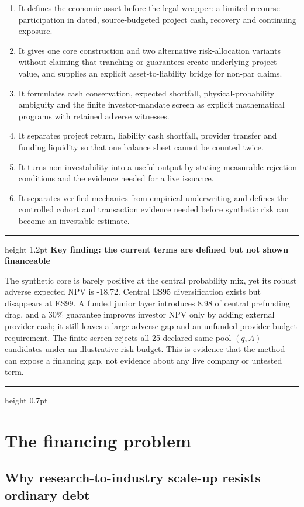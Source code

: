 \documentclass[11pt,a4paper]{article}
\newenvironment{paperbox}[1]{%
  \begin{center}\begin{minipage}{0.96\textwidth}%
  \color{Forest}\hrule height 1.2pt\vspace{0.65em}%
  {\large\bfseries #1}\par\smallskip\color{black}%
}{%
  \vspace{0.45em}\color{Gold}\hrule height 0.7pt
  \end{minipage}\end{center}%
}
\begin{document}
\begin{enumerate}
  \item It defines the economic asset before the legal wrapper: a limited-recourse participation in dated, source-budgeted project cash, recovery and continuing exposure.
  \item It gives one core construction and two alternative risk-allocation variants without claiming that tranching or guarantees create underlying project value, and supplies an explicit asset-to-liability bridge for non-par claims.
  \item It formulates cash conservation, expected shortfall, physical-probability ambiguity and the finite investor-mandate screen as explicit mathematical programs with retained adverse witnesses.
  \item It separates project return, liability cash shortfall, provider transfer and funding liquidity so that one balance sheet cannot be counted twice.
  \item It turns non-investability into a useful output by stating measurable rejection conditions and the evidence needed for a live issuance.
  \item It separates verified mechanics from empirical underwriting and defines the controlled cohort and transaction evidence needed before synthetic risk can become an investable estimate.
\end{enumerate}

\begin{paperbox}{Key finding: the current terms are defined but not shown financeable}
The synthetic core is barely positive at the central probability mix, yet its robust adverse expected NPV is -18.72. Central ES95 diversification exists but disappears at ES99. A funded junior layer introduces 8.98 of central prefunding drag, and a 30\% guarantee improves investor NPV only by adding external provider cash; it still leaves a large adverse gap and an unfunded provider budget requirement. The finite screen rejects all 25 declared same-pool \((q,A)\) candidates under an illustrative risk budget. This is evidence that the method can expose a financing gap, not evidence about any live company or untested term.
\end{paperbox}

\section{The financing problem}

\subsection{Why research-to-industry scale-up resists ordinary debt}
\end{document}
